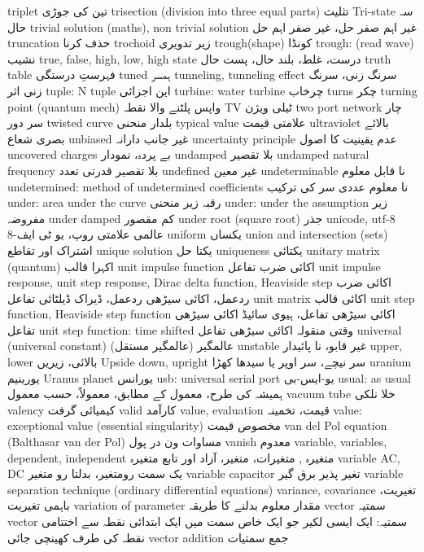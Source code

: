 triplet	تین کی جوڑی
trisection (division  into three equal parts)	تثلیث
Tri-state	سہ حال
trivial solution (maths), non trivial solution	غیر اہم صفر حل، غیر صفر اہم حل
truncation	حذف کرنا
trochoid	زیر تدویری
trough(shape)	کونڈا
trough: (read wave)	نشیب
true, false, high, low, high state	درست، غلط، بلند حال، پست حال
truth table	فہرستِ درستگی
tuned	ہمسر
tunneling, tunneling effect	سرنگ زنی، سرنگ زنی اثر
tuple:  N tuple	این اجزائی
turbine: water turbine	چرخاب
turns	چکر
turning point (quantum mech)	واپس پلٹنے والا نقطہ
TV	ٹیلی ویژن
two port network	چار سر دور
twisted curve	بلدار منحنی
typical value	علامتی قیمت
ultraviolet	بالائے بصری شعاع
unbiased	غیر جانب دارانہ
uncertainty principle	عدم یقینیت کا اصول
uncovered charges	بے پردہ، نمودار
undamped	بلا تقصیر
undamped natural frequency	بلا تقصیر قدرتی تعدد
undefined	غیر معین
undeterminable	نا قابل معلوم
undetermined: method of undetermined coefficients	نا معلوم عددی سر کی ترکیب
under: area under the curve	رقبہ زیر منحنی
under: under the assumption	زیر مفروضہ
under damped	کم مقصور
under root (square root)	جذر
unicode, utf-8	عالمی علامتی روپ، یو ٹی ایف-8 
uniform	یکساں
union and intersection (sets)	اشتراک اور تقاطع
unique solution	یکتا حل
uniqueness	یکتائی
unitary matrix (quantum)	اکہرا قالب
unit impulse function	اکائی ضرب تفاعل
unit impulse response, unit step response, Dirac delta function, Heaviside step	اکائی ضرب ردعمل، اکائی سیڑھی ردعمل، ڈیراک ڈیلٹائی تفاعل
unit matrix	اکائی قالب
unit step function, Heaviside step function	اکائی سیڑھی تفاعل، ہیوی سائیڈ اکائی سیڑھی تفاعل
unit step function: time shifted	وقتی منقولہ اکائی سیڑھی تفاعل
universal (universal constant)	عالمگیر  (عالمگیر مستقل)
unstable	غیر قابو، نا پائیدار
upper, lower	بالائی، زیریں
Upside down, upright	سر نیچے، سر اوپر یا سیدھا کھڑا
uranium	یورینیم
Uranus planet	یورانس
usb: universal serial port	یو-ایس-بی
usual: as usual	ہمیشہ کی طرح، معمول کے مطابق، معمولاً، حسب معمول
vacuum tube	خلا نلکی
valency	کیمیائی گرفت
valid	کارآمد
value, evaluation	قیمت، تخمینہ
value: exceptional value (essential singularity)	مخصوص قیمت
van del Pol equation (Balthasar van der Pol)	مساوات ون در پول
vanish	معدوم
variable, variables, dependent, independent	 متغیرہ , متغیرات، متغیر، آزاد اور تابع متغیرہ
variable AC, DC	یک سمت  رومتغیر، بدلتا رو متغیر
variable capacitor	تغیر پذیر برق گیر
variable separation technique (ordinary differential equations)	
variance, covariance	تغیریت، باہمی تغیریت
variation of parameter	مقدار معلوم بدلنے کا طریقہ
vector	سمتیہ
vector	سمتیہ: ایک ایسی لکیر جو ایک خاص سمت میں ایک ابتدائی نقطہ سے اختتامی نقطہ کی طرف کھینچی جائی
vector addition	جمع سمتیات
